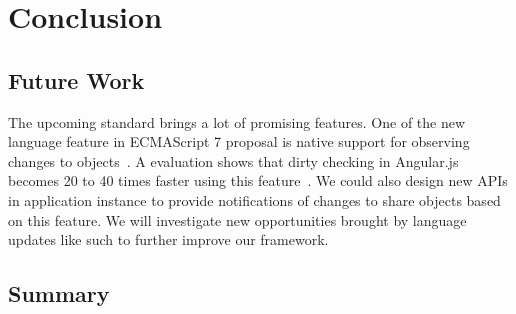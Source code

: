 \chapter{Conclusion}

\section{Future Work}
The upcoming \js standard brings a lot of promising features. 
One of the new language feature in ECMAScript 7 proposal is native
support for observing changes to objects~\cite{jsobserveprop}.
A evaluation shows that dirty checking in Angular.js becomes
20 to 40 times faster using this feature~\cite{angularjsspeedup}.
We could also design new APIs in application instance to provide
notifications of changes to share objects based on this feature.
We will investigate new opportunities brought by language updates
like such to further improve our framework.

% 




\section{Summary}